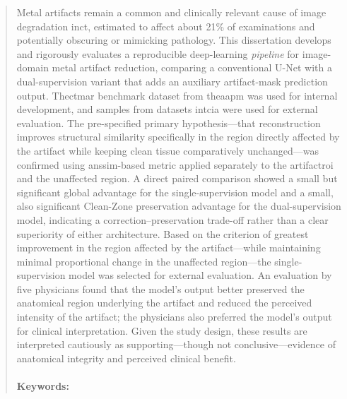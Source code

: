 \addvspacetoc{0.3cm} %


\begin{abstract}

Metal artifacts remain a common and clinically relevant cause of image degradation in\acrfull{ct}, estimated to affect about 21\% of examinations and potentially obscuring or mimicking pathology. This dissertation develops and rigorously evaluates a reproducible deep-learning \textit{pipeline} for image-domain metal artifact reduction, comparing a conventional U-Net with a dual-supervision variant that adds an auxiliary artifact-mask prediction output. The\acrfull{ctmar} benchmark dataset from the\acrfull{aapm} was used for internal development, and samples from datasets in\acrfull{tcia} were used for external evaluation. The pre-specified primary hypothesis---that reconstruction improves structural similarity specifically in the region directly affected by the artifact while keeping clean tissue comparatively unchanged---was confirmed using an\acrfull{ssim}-based metric applied separately to the artifact\acrfull{roi} and the unaffected region. A direct paired comparison showed a small but significant global advantage for the single-supervision model and a small, also significant Clean-Zone preservation advantage for the dual-supervision model, indicating a correction--preservation trade-off rather than a clear superiority of either architecture. Based on the criterion of greatest improvement in the region affected by the artifact—while maintaining minimal proportional change in the unaffected region—the single-supervision model was selected for external evaluation. An evaluation by five physicians found that the model's output better preserved the anatomical region underlying the artifact and reduced the perceived intensity of the artifact; the physicians also preferred the model's output for clinical interpretation. Given the study design, these results are interpreted cautiously as supporting—though not conclusive—evidence of anatomical integrity and perceived clinical benefit. \\
\\
\noindent\textbf{Keywords:} \keywordnames
\end{abstract}

